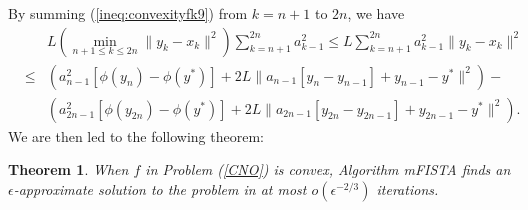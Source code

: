 \documentclass[11pt]{article}
\newtheorem{theorem}[thm]{Theorem}
\begin{document}
\noindent By summing (\ref{ineq:convexityfk9}) from $k = n+1$ to $2n$, we have
\begin{eqnarray}
& & L \left( \min_{n+1 \leq k \leq 2n}  \| y_k - x_k \|^2  \right) \sum_{k=n+1}^{2n} a_{k-1}^2 \leq L \sum_{k=n+1}^{2n} a_{k-1}^2 \| y_k - x_k \|^2 \nonumber \\
& \leq   & (a_{n-1}^2[\phi(y_{n}) - \phi(y^\ast)] + 2L\| a_{n-1}[y_{n} - y_{n-1}] + y_{n-1} - y^\ast \|^2) - \nonumber \\
& &  (a_{2n - 1}^2 [ \phi(y_{2n}) - \phi(y^\ast)] + 2L\| a_{2n -1}[y_{2n} - y_{2n - 1}] + y_{2n - 1} - y^\ast \|^2). \label{ineq:convexityfk10}
\end{eqnarray}
We are then led to the following theorem:
\begin{theorem}\label{thm:main2}
When $f$ in Problem (\ref{CNO}) is convex, Algorithm mFISTA finds an $\epsilon$-approximate solution to the problem in at most  $o(\epsilon^{-2/3})$ iterations.
\end{theorem}
\end{document}
